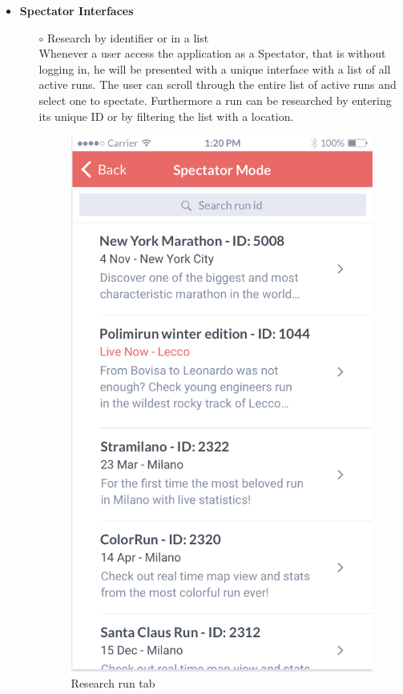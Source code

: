\documentclass[titlepage]{article}
\begin{document}
\begin{itemize}
\begin{itemize}
\begin{itemize}
				\end{itemize}
				\item{\bf Spectator Interfaces} \\
				\begin{itemize}
					\item[$\circ$] Research by identifier or in a list \\
					Whenever a user access the application as a Spectator, that is without logging in, he will be presented with a unique interface with a list of all active runs. The user can scroll through the entire list of active runs and select one to spectate. Furthermore a run can be researched by entering its unique ID or by filtering the list with a location.\\
					\begin{figure}[H]
						\center
  						\includegraphics[width=0.5\columnwidth]{Mockup/mockupResearch.png}
  						\caption{Research run tab}
 					 	\label{fig:Research}
					\end{figure}


\end{itemize}
\end{itemize}
\end{itemize}
\end{document}
